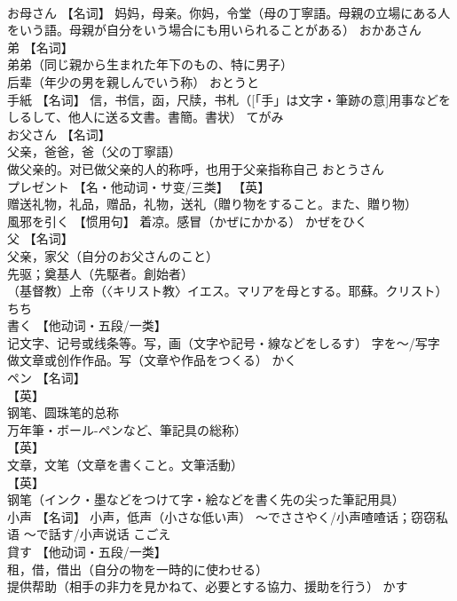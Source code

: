 \documentclass[8pt]{extreport}
\begin{document}
\begin{CJK}{UTF8}{min}
\\	お母さん	【名词】 妈妈，母亲。你妈，令堂（母の丁寧語。母親の立場にある人をいう語。母親が自分をいう場合にも用いられることがある）	おかあさん	
\\	弟	【名词】 
\\	弟弟（同じ親から生まれた年下のもの、特に男子） 
\\	后辈（年少の男を親しんでいう称）	おとうと	
\\	手紙	【名词】 信，书信，函，尺牍，书札（[「手」は文字・筆跡の意]用事などをしるして、他人に送る文書。書簡。書状）	てがみ	
\\	お父さん	【名词】 
\\	父亲，爸爸，爸（父の丁寧語） 
\\	做父亲的。对已做父亲的人的称呼，也用于父亲指称自己	おとうさん	
\\	プレゼント	【名・他动词・サ变/三类】 【英】
\\	赠送礼物，礼品，赠品，礼物，送礼（贈り物をすること。また、贈り物）		
\\	風邪を引く	【惯用句】 着凉。感冒（かぜにかかる）	かぜをひく	
\\	父	【名词】 
\\	父亲，家父（自分のお父さんのこと） 
\\	先驱；奠基人（先駆者。創始者） 
\\	（基督教）上帝（〈キリスト教〉イエス。マリアを母とする。耶蘇。クリスト）	ちち	
\\	書く	【他动词・五段/一类】 
\\	记文字、记号或线条等。写，画（文字や記号・線などをしるす） 字を～/写字 
\\	做文章或创作作品。写（文章や作品をつくる）	かく	
\\	ペン	【名词】 
\\	【英】 
\\	钢笔、圆珠笔的总称
\\	万年筆・ボール-ペンなど、筆記具の総称） 
\\	【英】 
\\	文章，文笔（文章を書くこと。文筆活動） 
\\	【英】
\\	钢笔（インク・墨などをつけて字・絵などを書く先の尖った筆記用具）		
\\	小声	【名词】 小声，低声（小さな低い声） ～でささやく/小声喳喳话；窃窃私语 ～で話す/小声说话	こごえ	
\\	貸す	【他动词・五段/一类】 
\\	租，借，借出（自分の物を一時的に使わせる） 
\\	提供帮助（相手の非力を見かねて、必要とする協力、援助を行う）	かす	

\end{CJK}
\end{document}

